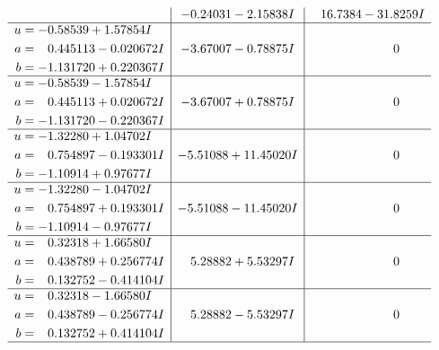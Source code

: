 \documentclass[1p]{elsarticle_modified}
\theoremstyle{definition}
\begin{document}
$$\begin{array}{c|c|c}
 & -0.24031 - 2.15838 I & \phantom{-}16.7384 - 31.8259 I \\ \hline\begin{aligned}
u &= -0.58539 + 1.57854 I \\
a &= \phantom{-}0.445113 - 0.020672 I \\
b &= -1.131720 + 0.220367 I\end{aligned}
 & -3.67007 - 0.78875 I & \phantom{-0.000000 } 0 \\ \hline\begin{aligned}
u &= -0.58539 - 1.57854 I \\
a &= \phantom{-}0.445113 + 0.020672 I \\
b &= -1.131720 - 0.220367 I\end{aligned}
 & -3.67007 + 0.78875 I & \phantom{-0.000000 } 0 \\ \hline\begin{aligned}
u &= -1.32280 + 1.04702 I \\
a &= \phantom{-}0.754897 - 0.193301 I \\
b &= -1.10914 + 0.97677 I\end{aligned}
 & -5.51088 + 11.45020 I & \phantom{-0.000000 } 0 \\ \hline\begin{aligned}
u &= -1.32280 - 1.04702 I \\
a &= \phantom{-}0.754897 + 0.193301 I \\
b &= -1.10914 - 0.97677 I\end{aligned}
 & -5.51088 - 11.45020 I & \phantom{-0.000000 } 0 \\ \hline\begin{aligned}
u &= \phantom{-}0.32318 + 1.66580 I \\
a &= \phantom{-}0.438789 + 0.256774 I \\
b &= \phantom{-}0.132752 - 0.414104 I\end{aligned}
 & \phantom{-}5.28882 + 5.53297 I & \phantom{-0.000000 } 0 \\ \hline\begin{aligned}
u &= \phantom{-}0.32318 - 1.66580 I \\
a &= \phantom{-}0.438789 - 0.256774 I \\
b &= \phantom{-}0.132752 + 0.414104 I\end{aligned}
 & \phantom{-}5.28882 - 5.53297 I & \phantom{-0.000000 } 0\\
 \hline 
 \end{array}$$\newpage$$\begin{array}{c|c|c}  

\end{array}$$
\end{document}
